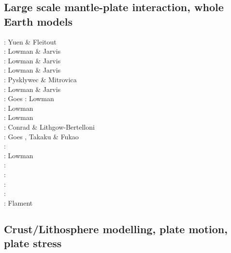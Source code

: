 \subsection{Large scale mantle-plate interaction, whole Earth models}

\begin{scriptsize}
\nineteeneightyfive: Yuen \& Fleitout \cite{yufl85}\\
\nineteenninetythree: Lowman \& Jarvis \cite{loja93}\\
\nineteenninetyfive: Lowman \& Jarvis \cite{loja95}\\
\nineteenninetysix: Lowman \& Jarvis \cite{loja96}\\
\nineteenninetyeight: Pysklywec \& Mitrovica \cite{pymi98}\\
\nineteenninetynine: Lowman \& Jarvis \cite{loja99}\\
\twothousand: Goes \etal \cite{golw00}
\twothousandone: Lowman \etal \cite{lokg01} \\
\twothousandthree: Lowman \etal \cite{lokg03} \\
\twothousandfour: Lowman \etal \cite{lokg04} \\
\twothousandsix: Conrad \& Lithgow-Bertelloni \cite{coli06}\\
\twothousandeight: Goes \etal \cite{gocm08}, Takaku \& Fukao \cite{tafu08}\\
\twothousandten: \cite{wamg10}\cite{stgb10}\cite{cobe10}\\
\twothousandeleven: Lowman \etal \cite{lokt11}\\
\twothousandtwelve: \cite{algs12}\cite{roct12}\cite{crtm12}\\
\twothousandthirteen: \cite{ghbh13}\cite{yahb13}\\
\twothousandsixteen: \cite{macs16}\\
\twothousandeighteen: \cite{hulz18}\cite{osss18b}\\
\twothousandnineteen: Flament \cite{flam19}
\end{scriptsize}

\subsection{Crust/Lithosphere modelling, plate motion, plate stress}

